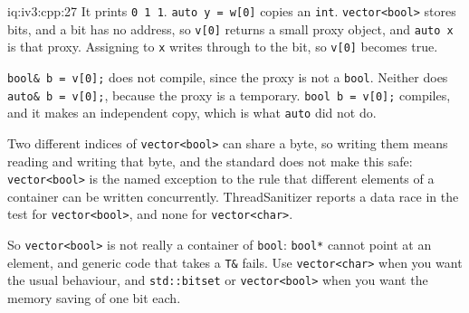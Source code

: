 \begin{solution}{iq:iv3:cpp:27}
It prints \texttt{0 1 1}. \texttt{auto y = w[0]} copies an \texttt{int}. \texttt{vector<bool>} stores bits, and a bit has no address, so \texttt{v[0]} returns a small proxy object, and \texttt{auto x} is that proxy. Assigning to \texttt{x} writes through to the bit, so \texttt{v[0]} becomes true.

\texttt{bool\& b = v[0];} does not compile, since the proxy is not a \texttt{bool}. Neither does \texttt{auto\& b = v[0];}, because the proxy is a temporary. \texttt{bool b = v[0];} compiles, and it makes an independent copy, which is what \texttt{auto} did not do.

Two different indices of \texttt{vector<bool>} can share a byte, so writing them means reading and writing that byte, and the standard does not make this safe: \texttt{vector<bool>} is the named exception to the rule that different elements of a container can be written concurrently. ThreadSanitizer reports a data race in the test for \texttt{vector<bool>}, and none for \texttt{vector<char>}.

So \texttt{vector<bool>} is not really a container of \texttt{bool}: \texttt{bool*} cannot point at an element, and generic code that takes a \texttt{T\&} fails. Use \texttt{vector<char>} when you want the usual behaviour, and \texttt{std::bitset} or \texttt{vector<bool>} when you want the memory saving of one bit each.

\end{solution}

